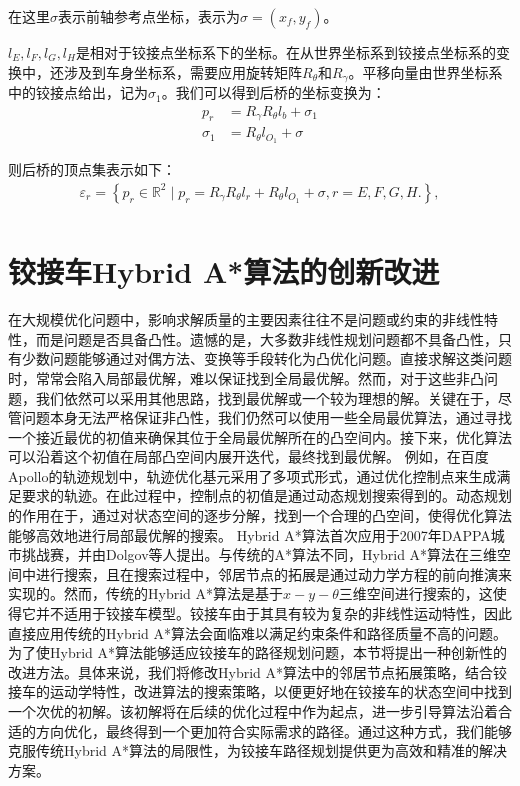 \documentclass[master,academic]{ysuthesis} %
\begin{document}
	在这里$\sigma$表示前轴参考点坐标，表示为$\sigma=(x_f,y_f)$。
	
	$l_E,l_F,l_G,l_H$是相对于铰接点坐标系下的坐标。在从世界坐标系到铰接点坐标系的变换中，还涉及到车身坐标系，需要应用旋转矩阵$R_\theta$和$R_\gamma$。平移向量由世界坐标系中的铰接点给出，记为$\sigma_1$。我们可以得到后桥的坐标变换为： 
	\begin{equation}
		\begin{aligned}
				p_r&=R_\gamma R_\theta l_b+\sigma_1\\
				\sigma_1&=R_\theta l_{O_1}+\sigma
		\end{aligned}
	\end{equation}

	则后桥的顶点集表示如下：
	\begin{equation}
		\begin{aligned}
			\varepsilon_r = \left\{ p_r \in \mathbb{R}^2 \mid p_r=R_\gamma R_\theta l_r+R_\theta l_{O_1}+\sigma,r = E,F,G,H.  \right\} ,\\
		\end{aligned}
	\end{equation}

	
	\section{铰接车Hybrid A*算法的创新改进}
	在大规模优化问题中，影响求解质量的主要因素往往不是问题或约束的非线性特性，而是问题是否具备凸性。遗憾的是，大多数非线性规划问题都不具备凸性，只有少数问题能够通过对偶方法、变换等手段转化为凸优化问题。直接求解这类问题时，常常会陷入局部最优解，难以保证找到全局最优解。然而，对于这些非凸问题，我们依然可以采用其他思路，找到最优解或一个较为理想的解。关键在于，尽管问题本身无法严格保证非凸性，我们仍然可以使用一些全局最优算法，通过寻找一个接近最优的初值来确保其位于全局最优解所在的凸空间内。接下来，优化算法可以沿着这个初值在局部凸空间内展开迭代，最终找到最优解。
	例如，在百度Apollo的轨迹规划中，轨迹优化基元采用了多项式形式，通过优化控制点来生成满足要求的轨迹。在此过程中，控制点的初值是通过动态规划搜索得到的。动态规划的作用在于，通过对状态空间的逐步分解，找到一个合理的凸空间，使得优化算法能够高效地进行局部最优解的搜索。
	Hybrid A*算法首次应用于2007年DAPPA城市挑战赛，并由Dolgov等人提出。与传统的A*算法不同，Hybrid A*算法在三维空间中进行搜索，且在搜索过程中，邻居节点的拓展是通过动力学方程的前向推演来实现的。然而，传统的Hybrid A*算法是基于$x-y-\theta$三维空间进行搜索的，这使得它并不适用于铰接车模型。铰接车由于其具有较为复杂的非线性运动特性，因此直接应用传统的Hybrid A*算法会面临难以满足约束条件和路径质量不高的问题。
	为了使Hybrid A*算法能够适应铰接车的路径规划问题，本节将提出一种创新性的改进方法。具体来说，我们将修改Hybrid A*算法中的邻居节点拓展策略，结合铰接车的运动学特性，改进算法的搜索策略，以便更好地在铰接车的状态空间中找到一个次优的初解。该初解将在后续的优化过程中作为起点，进一步引导算法沿着合适的方向优化，最终得到一个更加符合实际需求的路径。通过这种方式，我们能够克服传统Hybrid A*算法的局限性，为铰接车路径规划提供更为高效和精准的解决方案。
\end{document}
